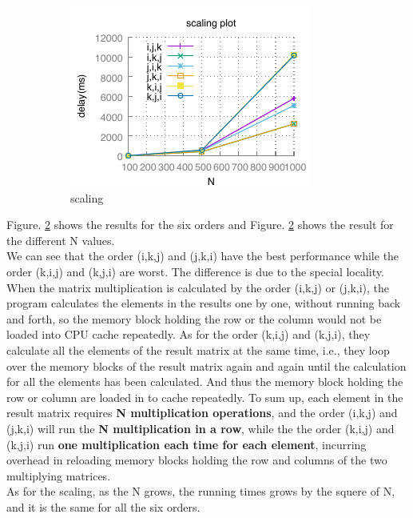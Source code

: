 \documentclass{article}
\begin{document}
\begin{figure}[h!]
\begin{subfigure}[b]{0.4\linewidth}
          \includegraphics[width=\linewidth]{matrix_scaling.pdf}
          \caption{scaling}
          \label{fig:scaling}
        \end{subfigure}
        \caption{\label{fig:part1}}
    \end{figure}

\indent Figure. \ref{fig:part1}  shows the results for the six orders and Figure. \ref{fig:part1}  shows the result for the different N values. \\
\indent We can see that the order (i,k,j) and (j,k,i) have the best performance while the order (k,i,j) and (k,j,i) are worst. The difference is due to the special locality. When the matrix multiplication is calculated by the order (i,k,j) or (j,k,i), the program calculates the elements in the results one by one, without running back and forth, so the memory block holding the row or the column would not be loaded into CPU cache repeatedly. As for the order (k,i,j) and (k,j,i), they calculate all the elements of the result matrix at the same time, i.e., they loop over the memory blocks of the result matrix again and again until the calculation for all the elements has been calculated. And thus the memory block holding the row or column are loaded in to cache repeatedly. To sum up, each element in the result matrix requires \textbf{N multiplication operations}, and the order (i,k,j) and (j,k,i) will run the \textbf{N multiplication in a row}, while the the order (k,i,j) and (k,j,i) run \textbf{one multiplication each time for each element}, incurring overhead in reloading memory blocks holding the row and columns of the two multiplying matrices.\\
\indent As for the scaling, as the N grows, the running times grows by the squere of N, and it is the same for all the six orders.
\end{document}
